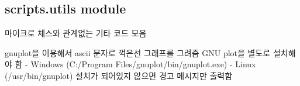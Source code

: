 \documentclass[letterpaper,10pt,english]{sphinxmanual}
\begin{document}
\subsection{scripts.utils module}
\label{\detokenize{scripts:module-scripts.utils}}\label{\detokenize{scripts:scripts-utils-module}}
마이크로 체스와 관계없는 기타 코드 모음

\begin{fulllineitems}
\label{\detokenize{scripts:scripts.utils.ascii_plot}}
gnuplot을 이용해서 ascii 문자로 꺽은선 그래프를 그려줌
GNU plot을 별도로 설치해야 함
- Windows (C:/Program Files/gnuplot/bin/gnuplot.exe)
- Linux (/usr/bin/gnuplot)
설치가 되어있지 않으면 경고 메시지만 출력함

%
\begin{sphinxVerbatim}[commandchars=\\\{\}]
   
  \PYG{p}{[}  \PYG{p}{]} \PYG{p}{[}  \PYG{p}{]}
\end{sphinxVerbatim}


\end{fulllineitems}
\end{document}
